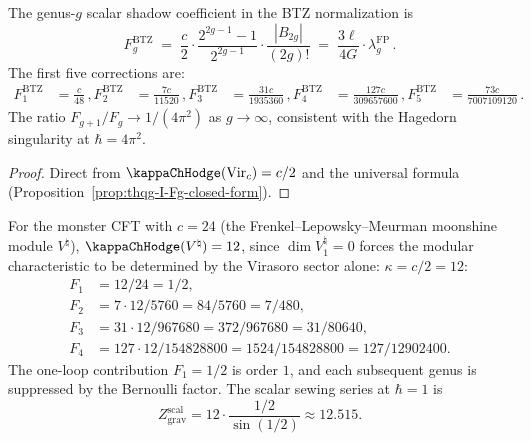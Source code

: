 \begin{proposition}
\label{prop:thqg-I-btz-higher-genus}
The genus-$g$ scalar shadow coefficient in the BTZ normalization is
\begin{equation}%
F_g^{\mathrm{BTZ}} \;=\; \frac{c}{2} \cdot \frac{2^{2g-1}-1}{2^{2g-1}} \cdot \frac{|B_{2g}|}{(2g)!} \;=\; \frac{3\ell}{4G} \cdot \lambda_g^{\mathrm{FP}}\,.
\end{equation}
The first five corrections are:
\begin{align}
F_1^{\mathrm{BTZ}} &= \frac{c}{48}\,, %
F_2^{\mathrm{BTZ}} &= \frac{7c}{11520}\,, %
F_3^{\mathrm{BTZ}} &= \frac{31c}{1935360}\,, %
F_4^{\mathrm{BTZ}} &= \frac{127c}{309657600}\,, %
F_5^{\mathrm{BTZ}} &= \frac{73c}{7007109120}\,. %
\end{align}
The ratio $F_{g+1}/F_g \to 1/(4\pi^2)$ as $g \to \infty$, consistent with the Hagedorn singularity at $\hbar = 4\pi^2$.
\end{proposition}

\begin{proof}
Direct from $\kappaChHodge(\mathrm{Vir}_c) = c/2$ and the universal formula (Proposition~\ref{prop:thqg-I-Fg-closed-form}).
\end{proof}

\begin{remark}[Numerical values for $c = 24$ (monster CFT)]
For the monster CFT with $c = 24$ (the Frenkel--Lepowsky--Meurman moonshine module $V^\natural$), $\kappaChHodge(V^\natural) = 12$, since $\dim V_1^\natural = 0$ forces the modular characteristic to be determined by the Virasoro sector alone: $\kappa = c/2 = 12$:
\begin{align*}
F_1 &= 12/24 = 1/2, \\
F_2 &= 7 \cdot 12/5760 = 84/5760 = 7/480, \\
F_3 &= 31 \cdot 12/967680 = 372/967680 = 31/80640, \\
F_4 &= 127 \cdot 12/154828800 = 1524/154828800 = 127/12902400.
\end{align*}
The one-loop contribution $F_1 = 1/2$ is order $1$, and each
subsequent genus is suppressed by the Bernoulli factor. The scalar
sewing series at $\hbar = 1$ is
\[
Z_{\mathrm{grav}}^{\mathrm{scal}} = 12 \cdot \frac{1/2}{\sin(1/2)}
\approx 12.515.
\]
\end{remark}

